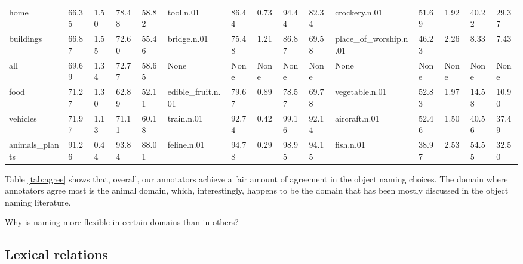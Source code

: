 \begin{table*}
\begin{tabular}{lllllllllllllll}
           home &  66.35 &  1.50 &  78.48 &  58.82 &          tool.n.01 &  86.44 &  0.73 &  94.44 &  82.34 &          crockery.n.01 &  51.69 &  1.92 &  40.22 &  29.37 \\
      buildings &  66.87 &  1.55 &  72.60 &  55.46 &        bridge.n.01 &  75.48 &  1.21 &  86.87 &  69.58 &  place\_of\_worship.n.01 &  46.23 &  2.26 &   8.33 &   7.43 \\
            all &  69.69 &  1.34 &  72.77 &  58.65 &               None &   None &  None &   None &   None &                   None &   None &  None &   None &   None \\
           food &  71.27 &  1.30 &  62.89 &  52.11 &  edible\_fruit.n.01 &  79.67 &  0.89 &  78.57 &  69.78 &         vegetable.n.01 &  52.83 &  1.97 &  14.58 &  10.90 \\
       vehicles &  71.97 &  1.13 &  71.11 &  60.18 &         train.n.01 &  92.74 &  0.42 &  99.16 &  92.14 &          aircraft.n.01 &  52.46 &  1.50 &  40.56 &  37.49 \\
 animals\_plants &  91.26 &  0.44 &  93.84 &  88.01 &        feline.n.01 &  94.78 &  0.29 &  98.95 &  94.15 &              fish.n.01 &  38.97 &  2.53 &  54.55 &  32.50 \\
\bottomrule
\end{tabular}
\caption{Agreement in object names for objects of different domains, if applicable, synsets with maximal and minimal agreement (top \%) are shown }
\label{tab:agree}
\end{table*}

Table \ref{tab:agree} shows that, overall, our annotators achieve a fair amount of agreement in the object naming choices. The domain where annotators agree most is the animal domain, which, interestingly, happens to be the domain that has been mostly discussed in the object naming literature. 

Why is naming more flexible in certain domains than in others? 

\subsection{Lexical relations}

